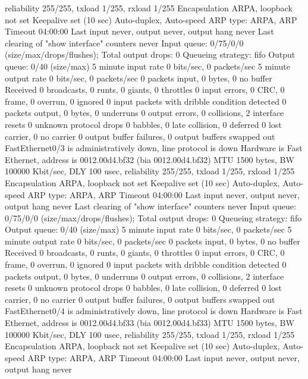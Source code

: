      reliability 255/255, txload 1/255, rxload 1/255
  Encapsulation ARPA, loopback not set
  Keepalive set (10 sec)
  Auto-duplex, Auto-speed
  ARP type: ARPA, ARP Timeout 04:00:00
  Last input never, output never, output hang never
  Last clearing of "show interface" counters never
  Input queue: 0/75/0/0 (size/max/drops/flushes); Total output drops: 0
  Queueing strategy: fifo
  Output queue: 0/40 (size/max)
  5 minute input rate 0 bits/sec, 0 packets/sec
  5 minute output rate 0 bits/sec, 0 packets/sec
     0 packets input, 0 bytes, 0 no buffer
     Received 0 broadcasts, 0 runts, 0 giants, 0 throttles
     0 input errors, 0 CRC, 0 frame, 0 overrun, 0 ignored
     0 input packets with dribble condition detected
     0 packets output, 0 bytes, 0 underruns
     0 output errors, 0 collisions, 2 interface resets
     0 unknown protocol drops
     0 babbles, 0 late collision, 0 deferred
     0 lost carrier, 0 no carrier
     0 output buffer failures, 0 output buffers swapped out
FastEthernet0/3 is administratively down, line protocol is down 
  Hardware is Fast Ethernet, address is 0012.00d4.bf32 (bia 0012.00d4.bf32)
  MTU 1500 bytes, BW 100000 Kbit/sec, DLY 100 usec, 
     reliability 255/255, txload 1/255, rxload 1/255
  Encapsulation ARPA, loopback not set
  Keepalive set (10 sec)
  Auto-duplex, Auto-speed
  ARP type: ARPA, ARP Timeout 04:00:00
  Last input never, output never, output hang never
  Last clearing of "show interface" counters never
  Input queue: 0/75/0/0 (size/max/drops/flushes); Total output drops: 0
  Queueing strategy: fifo
  Output queue: 0/40 (size/max)
  5 minute input rate 0 bits/sec, 0 packets/sec
  5 minute output rate 0 bits/sec, 0 packets/sec
     0 packets input, 0 bytes, 0 no buffer
     Received 0 broadcasts, 0 runts, 0 giants, 0 throttles
     0 input errors, 0 CRC, 0 frame, 0 overrun, 0 ignored
     0 input packets with dribble condition detected
     0 packets output, 0 bytes, 0 underruns
     0 output errors, 0 collisions, 2 interface resets
     0 unknown protocol drops
     0 babbles, 0 late collision, 0 deferred
     0 lost carrier, 0 no carrier
     0 output buffer failures, 0 output buffers swapped out
FastEthernet0/4 is administratively down, line protocol is down 
  Hardware is Fast Ethernet, address is 0012.00d4.bf33 (bia 0012.00d4.bf33)
  MTU 1500 bytes, BW 100000 Kbit/sec, DLY 100 usec, 
     reliability 255/255, txload 1/255, rxload 1/255
  Encapsulation ARPA, loopback not set
  Keepalive set (10 sec)
  Auto-duplex, Auto-speed
  ARP type: ARPA, ARP Timeout 04:00:00
  Last input never, output never, output hang never
